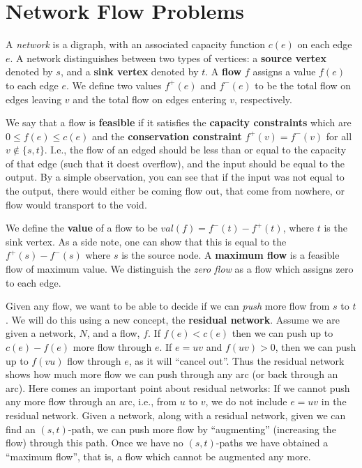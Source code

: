 \documentclass{Book}
\begin{document}
\section{Network Flow Problems}%
\label{sec:label}

A \textit{network} is a digraph, with an associated capacity function $c(e)$ on each edge $e$. A network distinguishes between two types of vertices: a \textbf{source vertex} denoted by $s$, and a \textbf{sink vertex} denoted by $t$. A \textbf{flow} $f$ assigns a value $f(e)$ to each edge $e$. We define two values $f^{+}(e)$ and $f^{-}(e)$ to be the total flow on edges leaving $v$ and the total flow on edges entering $v$, respectively.

We say that a flow is \textbf{feasible} if it satisfies the \textbf{capacity constraints} which are $0 \le f(e) \le c(e)$ and the \textbf{conservation constraint} $f^{+}(v) = f^{-}(v)$ for all $v \notin \{s,t\}$. I.e., the flow of an edged should be less than or equal to the capacity of that edge (such that it doest overflow), and the input should be equal to the output. By a simple observation, you can see that if the input was not equal to the output, there would either be coming flow out, that come from nowhere, or flow would transport to the void.

We define the \textbf{value} of a flow to be $val(f) = f^{-}(t) - f^{+}(t)$, where $t$ is the sink vertex. As a side note, one can show that this is equal to the $f^{+}(s) - f^{-}(s)$ where $s$ is the source node. A \textbf{maximum flow} is a feasible flow of maximum value. We distinguish the \textit{zero flow} as a flow which assigns zero to each edge.

Given any flow, we want to be able to decide if we can \textit{push} more flow from $s$ to $t$. We will do this using a new concept, the \textbf{residual network}. Assume we are given a network, $N$, and a flow, $f$. If $f(e) < c(e)$ then we can push up to $c(e)-f(e)$ more flow through $e$. If $e = uv$ and $f(uv) > 0$, then we can push up to $f(vu)$ flow through $e$, as it will ``cancel out''. Thus the residual network shows how much more flow we can push through any arc (or back through an arc). Here comes an important point about residual networks: If we cannot push any more flow through an arc, i.e., from $u$ to $v$, we do not include $e = uv$ in the residual network. Given a network, along with a residual network, given we can find an $(s,t)$-path, we can push more flow by ``augmenting'' (increasing the flow) through this path. Once we have no $(s,t)$-paths we have obtained a ``maximum flow'', that is, a flow which cannot be augmented any more.
\end{document}

